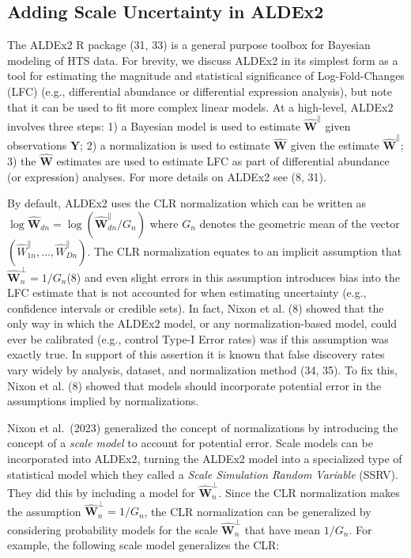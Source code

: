 \documentclass[
]{article}
\begin{document}
\subsection{Adding Scale Uncertainty in
ALDEx2}\label{adding-scale-uncertainty-in-aldex2}

The ALDEx2 R package (31, 33) is a general purpose toolbox for Bayesian
modeling of HTS data. For brevity, we discuss ALDEx2 in its simplest
form as a tool for estimating the magnitude and statistical significance
of Log-Fold-Changes (LFC) (e.g., differential abundance or differential
expression analysis), but note that it can be used to fit more complex
linear models. At a high-level, ALDEx2 involves three steps: 1) a
Bayesian model is used to estimate \(\mathbf{\hat{W}}^{\parallel}\)
given observations \(\mathbf{Y}\); 2) a normalization is used to
estimate \(\mathbf{\hat{W}}\) given the estimate
\(\mathbf{\hat{W}}^{\parallel}\); 3) the \(\mathbf{\hat{W}}\) estimates
are used to estimate LFC as part of differential abundance (or
expression) analyses. For more details on ALDEx2 see (8, 31).

By default, ALDEx2 uses the CLR normalization which can be written as
\(\log \mathbf{\hat{W}}_{dn}=\log (\mathbf{\hat{W}}^{\parallel}_{dn}/G_{n})\)
where \(G_{n}\) denotes the geometric mean of the vector
\((\hat{W}^{\parallel}_{1n}, \dots, \hat{W}^{\parallel}_{Dn})\). The CLR
normalization equates to an implicit assumption that
\(\mathbf{\hat{W}}^{\perp}_{n}=1/G_{n}\)(8) and even slight errors in
this assumption introduces bias into the LFC estimate that is not
accounted for when estimating uncertainty (e.g., confidence intervals or
credible sets). In fact, Nixon et al. (8) showed that the only way in
which the ALDEx2 model, or any normalization-based model, could ever be
calibrated (e.g., control Type-I Error rates) was if this assumption was
exactly true. In support of this assertion it is known that false
discovery rates vary widely by analysis, dataset, and normalization
method (34, 35). To fix this, Nixon et al. (8) showed that models should
incorporate potential error in the assumptions implied by
normalizations.

Nixon et al.~(2023) generalized the concept of normalizations by
introducing the concept of a \textit{scale model} to account for
potential error. Scale models can be incorporated into ALDEx2, turning
the ALDEx2 model into a specialized type of statistical model which they
called a \textit{Scale Simulation Random   Variable} (SSRV). They did
this by including a model for \(\mathbf{\hat{W}}^{\perp}_{n}\). Since
the CLR normalization makes the assumption
\(\mathbf{\hat{W}}^{\perp}_{n}=1/G_{n}\), the CLR normalization can be
generalized by considering probability models for the scale
\(\mathbf{\hat{W}}^{\perp}_{n}\) that have mean \(1/G_{n}\). For
example, the following scale model generalizes the CLR:
\end{document}
